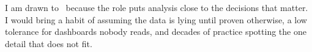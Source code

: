 
I am drawn to \theshortname\ because the role puts analysis close to the decisions that matter. I would bring a habit of assuming the data is lying until proven otherwise, a low tolerance for dashboards nobody reads, and decades of practice spotting the one detail that does not fit.

